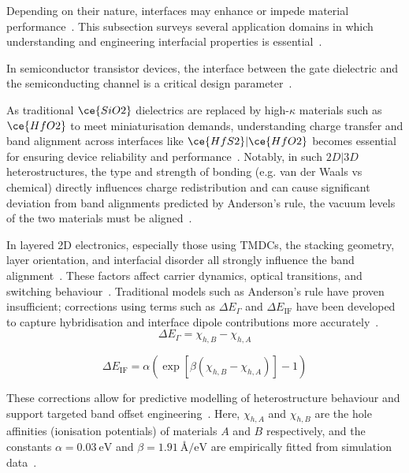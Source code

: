\label{interface_applications} Depending on their nature, interfaces may enhance or impede material performance~\cite{Butler2019-ws, Leitherer2023-ew}.
This subsection surveys several application domains in which understanding and engineering interfacial properties is essential~\nocite{}.

\label{gate_dielectric_interface} In semiconductor transistor devices, the interface between the gate dielectric and the semiconducting channel is a critical design parameter~\cite{Schusteritsch2015-lw, Wild2025-jy}.

\newpage As traditional $\ce{SiO2}$ dielectrics are replaced by high-$\kappa$ materials such as $\ce{HfO2}$ to meet miniaturisation demands, understanding charge transfer and band alignment across interfaces like $\ce{HfS2}|\ce{HfO2}$ becomes essential for ensuring device reliability and performance~\cite{Taylor2023-wh}.
Notably, in such $2D|3D$ heterostructures, the type and strength of bonding (e.g. van der Waals vs chemical) directly influences charge redistribution and can cause significant deviation from band alignments predicted by Anderson's rule, the vacuum levels of the two materials must be aligned~\cite{Davies2021-zh}.

\label{tmdc_interface_band_alignment} In layered 2D electronics, especially those using TMDCs, the stacking geometry, layer orientation, and interfacial disorder all strongly influence the band alignment~\cite{Davies2024-ju}.
These factors affect carrier dynamics, optical transitions, and switching behaviour~\nocite{}.
Traditional models such as Anderson's rule have proven insufficient; corrections using terms such as $\Delta E_\Gamma$ and $\Delta E_{\text{IF}}$ have been developed to capture hybridisation and interface dipole contributions more accurately~\cite{Butler2019-ws, Davies2024-ju}.
\begin{equation}
\Delta E_\Gamma = \chi_{h,B} - \chi_{h,A}
\end{equation}

\begin{equation}
\Delta E_{\mathrm{IF}} = \alpha \left( \exp\left[ \beta \left( \chi_{h,B} - \chi_{h,A} \right) \right] - 1 \right)
\end{equation}

These corrections allow for predictive modelling of heterostructure behaviour and support targeted band offset engineering~\nocite{}.
Here, $\chi_{h,A}$ and $\chi_{h,B}$ are the hole affinities (ionisation potentials) of materials $A$ and $B$ respectively, and the constants $\alpha = 0.03~\text{eV}$ and $\beta = 1.91~\text{\AA{}/eV}$ are empirically fitted from simulation data~\cite{Davies2024-ju}.

